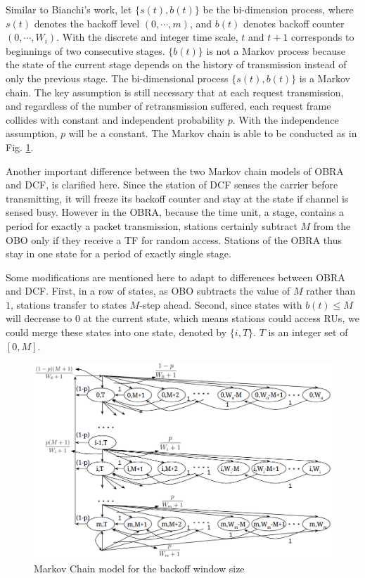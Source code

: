 \documentclass[journal]{IEEEtran}
\begin{document}
Similar to Bianchi's work, let $\lbrace s(t), b(t) \rbrace$ be the bi-dimension process, where $s(t)$ denotes the backoff level $(0,\cdots, m)$, and $b(t)$ denotes backoff counter $(0,\cdots, W_i)$.
With the discrete and integer time scale, $t$ and $t+1$ corresponds to beginnings of two consecutive stages.
$\lbrace b(t) \rbrace$ is not a Markov process because the state of the current stage depends on the history of transmission instead of only the previous stage. 
The bi-dimensional process $\lbrace s(t),b(t) \rbrace$ is a Markov chain.
The key assumption is still necessary that at each request transmission, and regardless of the number of retransmission suffered, each request frame collides with constant and independent probability $p$.
With the independence assumption, $p$ will be a constant. The Markov chain is able to be conducted as in Fig. \ref{Markov}.

Another important difference between the two Markov chain models of OBRA and DCF, is clarified here.
Since the station of DCF senses the carrier before transmitting, it will freeze its backoff counter and stay at the state if channel is sensed busy. 
However in the OBRA, because the time unit, a stage, contains a period for exactly a packet transmission, stations certainly subtract $M$ from the OBO only if they receive a TF for random access. 
Stations of the OBRA thus stay in one state for a period of exactly single stage.

Some modifications are mentioned here to adapt to differences between OBRA and DCF. 
First, in a row of states, as OBO subtracts the value of $M$ rather than $1$, stations transfer to states $M$-step ahead.
Second, since states with $b(t)\leq M $ will decrease to $0$ at the current state, which means stations could access RUs, we could merge these states into one state, denoted by $\lbrace i, T \rbrace$. $T$ is an integer set of $[0,M]$. 

\begin{figure}[!t]
\includegraphics[scale=.45]{./figure/Markov_chain.png}
\caption{Markov Chain model for the backoff window size}
\label{Markov}
\end{figure}
\end{document}
